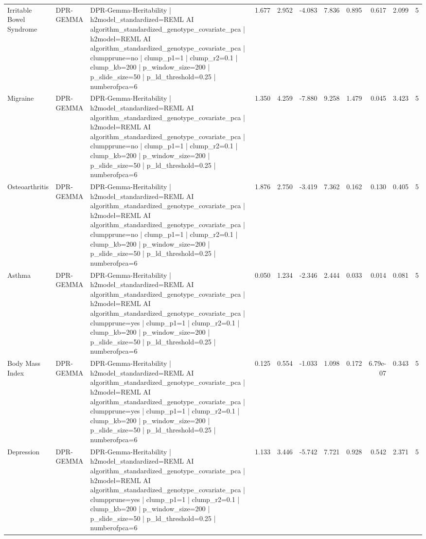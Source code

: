 \begin{landscape}
\begin{longtable}{p{2.4cm}p{1.8cm}p{6.0cm}rrrrrrrr}
Irritable Bowel Syndrome & DPR-GEMMA & DPR-Gemma-Heritability | h2model\_standardized=REML AI algorithm\_standardized\_genotype\_covariate\_pca | h2model=REML AI algorithm\_standardized\_genotype\_covariate\_pca | clumpprune=no | clump\_p1=1 | clump\_r2=0.1 | clump\_kb=200 | p\_window\_size=200 | p\_slide\_size=50 | p\_ld\_threshold=0.25 | numberofpca=6 & 1.677 & 2.952 & -4.083 & 7.836 & 0.895 & 0.617 & 2.099 & 5 \\
Migraine & DPR-GEMMA & DPR-Gemma-Heritability | h2model\_standardized=REML AI algorithm\_standardized\_genotype\_covariate\_pca | h2model=REML AI algorithm\_standardized\_genotype\_covariate\_pca | clumpprune=no | clump\_p1=1 | clump\_r2=0.1 | clump\_kb=200 | p\_window\_size=200 | p\_slide\_size=50 | p\_ld\_threshold=0.25 | numberofpca=6 & 1.350 & 4.259 & -7.880 & 9.258 & 1.479 & 0.045 & 3.423 & 5 \\
Osteoarthritis & DPR-GEMMA & DPR-Gemma-Heritability | h2model\_standardized=REML AI algorithm\_standardized\_genotype\_covariate\_pca | h2model=REML AI algorithm\_standardized\_genotype\_covariate\_pca | clumpprune=no | clump\_p1=1 | clump\_r2=0.1 | clump\_kb=200 | p\_window\_size=200 | p\_slide\_size=50 | p\_ld\_threshold=0.25 | numberofpca=6 & 1.876 & 2.750 & -3.419 & 7.362 & 0.162 & 0.130 & 0.405 & 5 \\
Asthma & DPR-GEMMA & DPR-Gemma-Heritability | h2model\_standardized=REML AI algorithm\_standardized\_genotype\_covariate\_pca | h2model=REML AI algorithm\_standardized\_genotype\_covariate\_pca | clumpprune=yes | clump\_p1=1 | clump\_r2=0.1 | clump\_kb=200 | p\_window\_size=200 | p\_slide\_size=50 | p\_ld\_threshold=0.25 | numberofpca=6 & 0.050 & 1.234 & -2.346 & 2.444 & 0.033 & 0.014 & 0.081 & 5 \\
Body Mass Index & DPR-GEMMA & DPR-Gemma-Heritability | h2model\_standardized=REML AI algorithm\_standardized\_genotype\_covariate\_pca | h2model=REML AI algorithm\_standardized\_genotype\_covariate\_pca | clumpprune=yes | clump\_p1=1 | clump\_r2=0.1 | clump\_kb=200 | p\_window\_size=200 | p\_slide\_size=50 | p\_ld\_threshold=0.25 | numberofpca=6 & 0.125 & 0.554 & -1.033 & 1.098 & 0.172 & 6.79e-07 & 0.343 & 5 \\
Depression & DPR-GEMMA & DPR-Gemma-Heritability | h2model\_standardized=REML AI algorithm\_standardized\_genotype\_covariate\_pca | h2model=REML AI algorithm\_standardized\_genotype\_covariate\_pca | clumpprune=yes | clump\_p1=1 | clump\_r2=0.1 | clump\_kb=200 | p\_window\_size=200 | p\_slide\_size=50 | p\_ld\_threshold=0.25 | numberofpca=6 & 1.133 & 3.446 & -5.742 & 7.721 & 0.928 & 0.542 & 2.371 & 5 \\

\end{longtable}
\end{landscape}
